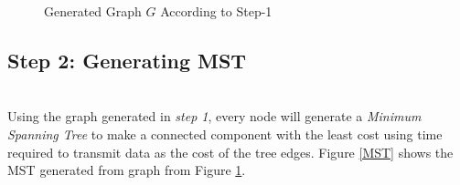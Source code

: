 \documentclass[12pt,notitlepage,oneside]{report}
\begin{document}
\begin{figure}[!htbp]
	\centering
	\caption{Generated Graph $G$ According to Step-1}
	\label{G}
\end{figure}

\subsection{\textbf{Step 2: Generating MST}}\hspace*{\fill} \\
Using the graph generated in \textit{step 1}, every node will generate a \textit{Minimum Spanning Tree} to make a connected component with the least cost using time required to transmit data as the cost of the tree edges. 
Figure \ref{MST} shows the MST generated from graph from Figure \ref{G}.
\end{document}
